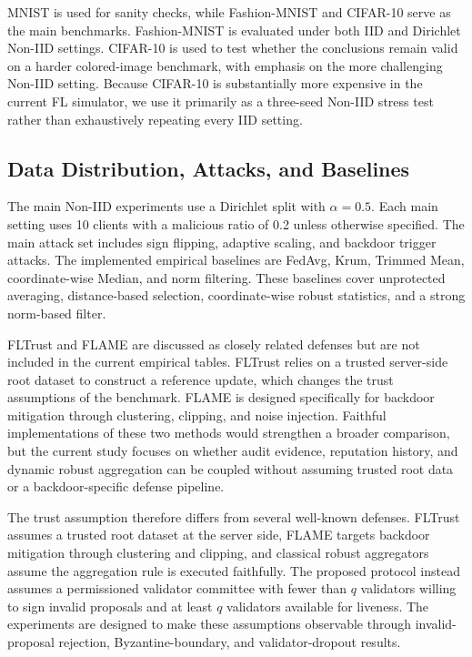 \documentclass[preprint,authoryear,12pt]{elsarticle}
\begin{document}
MNIST is used for sanity checks, while Fashion-MNIST and CIFAR-10 serve as the main benchmarks. Fashion-MNIST is evaluated under both IID and Dirichlet Non-IID settings. CIFAR-10 is used to test whether the conclusions remain valid on a harder colored-image benchmark, with emphasis on the more challenging Non-IID setting. Because CIFAR-10 is substantially more expensive in the current FL simulator, we use it primarily as a three-seed Non-IID stress test rather than exhaustively repeating every IID setting.

\subsection{Data Distribution, Attacks, and Baselines}

The main Non-IID experiments use a Dirichlet split with $\alpha=0.5$. Each main setting uses 10 clients with a malicious ratio of 0.2 unless otherwise specified. The main attack set includes sign flipping, adaptive scaling, and backdoor trigger attacks. The implemented empirical baselines are FedAvg, Krum, Trimmed Mean, coordinate-wise Median, and norm filtering. These baselines cover unprotected averaging, distance-based selection, coordinate-wise robust statistics, and a strong norm-based filter.

FLTrust and FLAME are discussed as closely related defenses but are not included in the current empirical tables. FLTrust relies on a trusted server-side root dataset to construct a reference update, which changes the trust assumptions of the benchmark. FLAME is designed specifically for backdoor mitigation through clustering, clipping, and noise injection. Faithful implementations of these two methods would strengthen a broader comparison, but the current study focuses on whether audit evidence, reputation history, and dynamic robust aggregation can be coupled without assuming trusted root data or a backdoor-specific defense pipeline.

The trust assumption therefore differs from several well-known defenses. FLTrust assumes a trusted root dataset at the server side, FLAME targets backdoor mitigation through clustering and clipping, and classical robust aggregators assume the aggregation rule is executed faithfully. The proposed protocol instead assumes a permissioned validator committee with fewer than $q$ validators willing to sign invalid proposals and at least $q$ validators available for liveness. The experiments are designed to make these assumptions observable through invalid-proposal rejection, Byzantine-boundary, and validator-dropout results.
\end{document}

